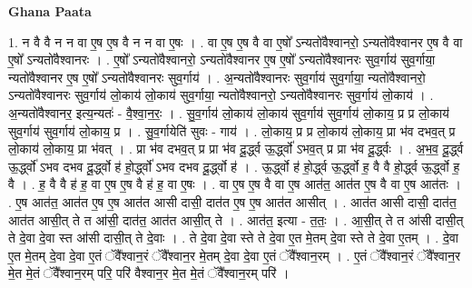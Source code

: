 \documentclass[17pt]{extarticle}
\begin{document}
\textbf{Ghana Paata } \newline

1. न वै वै न न वा ए॒ष ए॒ष वै न न वा ए॒षः । . वा ए॒ष ए॒ष वै वा ए॒षो᳚ ऽन्यतो॑वैश्वानरो॒ ऽन्यतो॑वैश्वानर ए॒ष वै वा ए॒षो᳚ ऽन्यतो॑वैश्वानरः । . ए॒षो᳚ ऽन्यतो॑वैश्वानरो॒ ऽन्यतो॑वैश्वानर ए॒ष ए॒षो᳚ ऽन्यतो॑वैश्वानरः सुव॒र्गाय॑ सुव॒र्गाया॒ न्यतो॑वैश्वानर ए॒ष ए॒षो᳚ ऽन्यतो॑वैश्वानरः सुव॒र्गाय॑ । . अ॒न्यतो॑वैश्वानरः सुव॒र्गाय॑ सुव॒र्गाया॒ न्यतो॑वैश्वानरो॒ ऽन्यतो॑वैश्वानरः सुव॒र्गाय॑ लो॒काय॑ लो॒काय॑ सुव॒र्गाया॒ न्यतो॑वैश्वानरो॒ ऽन्यतो॑वैश्वानरः सुव॒र्गाय॑ लो॒काय॑ । . अ॒न्यतो॑वैश्वानर॒ इत्य॒न्यतः॑ - वै॒श्वा॒न॒रः॒ । . सु॒व॒र्गाय॑ लो॒काय॑ लो॒काय॑ सुव॒र्गाय॑ सुव॒र्गाय॑ लो॒काय॒ प्र प्र लो॒काय॑ सुव॒र्गाय॑ सुव॒र्गाय॑ लो॒काय॒ प्र । . सु॒व॒र्गायेति॑ सुवः - गाय॑ । . लो॒काय॒ प्र प्र लो॒काय॑ लो॒काय॒ प्रा भ॑व दभव॒त् प्र लो॒काय॑ लो॒काय॒ प्रा भ॑वत् । . प्रा भ॑व दभव॒त् प्र प्रा भ॑व दू॒र्द्ध्व ऊ॒र्द्ध्वो॑ ऽभव॒त् प्र प्रा भ॑व दू॒र्द्ध्वः । . अ॒भ॒व॒ दू॒र्द्ध्व ऊ॒र्द्ध्वो॑ ऽभव दभव दू॒र्द्ध्वो ह॑ हो॒र्द्ध्वो॑ ऽभव दभव दू॒र्द्ध्वो ह॑ । . ऊ॒र्द्ध्वो ह॑ हो॒र्द्ध्व ऊ॒र्द्ध्वो ह॒ वै वै हो॒र्द्ध्व ऊ॒र्द्ध्वो ह॒ वै । . ह॒ वै वै ह॑ ह॒ वा ए॒ष ए॒ष वै ह॑ ह॒ वा ए॒षः । . वा ए॒ष ए॒ष वै वा ए॒ष आत॑त॒ आत॑त ए॒ष वै वा ए॒ष आत॑तः । . ए॒ष आत॑त॒ आत॑त ए॒ष ए॒ष आत॑त आसी दासी॒ दात॑त ए॒ष ए॒ष आत॑त आसीत् । . आत॑त आसी दासी॒ दात॑त॒ आत॑त आसी॒त् ते त आ॑सी॒ दात॑त॒ आत॑त आसी॒त् ते । . आत॑त॒ इत्या - त॒तः॒ । . आ॒सी॒त् ते त आ॑सी दासी॒त् ते दे॒वा दे॒वा स्त आ॑सी दासी॒त् ते दे॒वाः । . ते दे॒वा दे॒वा स्ते ते दे॒वा ए॒त मे॒तम् दे॒वा स्ते ते दे॒वा ए॒तम् । . दे॒वा ए॒त मे॒तम् दे॒वा दे॒वा ए॒तं ॅवै᳚श्वान॒रं ॅवै᳚श्वान॒र मे॒तम् दे॒वा दे॒वा ए॒तं ॅवै᳚श्वान॒रम् । . ए॒तं ॅवै᳚श्वान॒रं ॅवै᳚श्वान॒र मे॒त मे॒तं ॅवै᳚श्वान॒रम् परि॒ परि॑ वैश्वान॒र मे॒त मे॒तं ॅवै᳚श्वान॒रम् परि॑ । \newline
\end{document}
